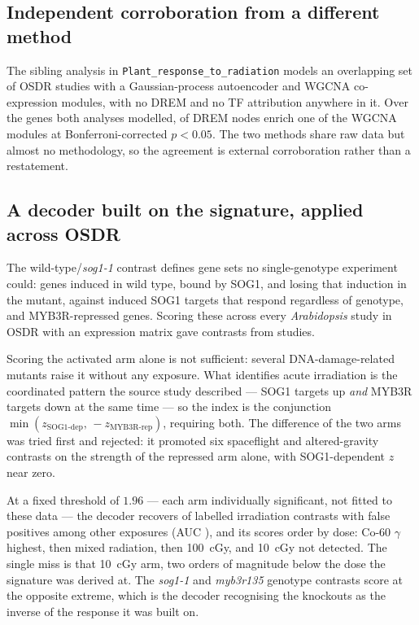\subsection{Independent corroboration from a different method}

The sibling analysis in \texttt{Plant\_response\_to\_radiation} models an overlapping set
of OSDR studies with a Gaussian-process autoencoder and WGCNA co-expression modules, with
no DREM and no TF attribution anywhere in it. Over the
\NumSharedGenesWithSibling{} genes both analyses modelled,
\NumNodesEnrichingModule{} of \NumSiblingNodes{} DREM nodes enrich one of the
\NumSiblingModules{} WGCNA modules at Bonferroni-corrected $p < 0.05$. The two methods
share raw data but almost no methodology, so the agreement is external corroboration
rather than a restatement.

\subsection{A decoder built on the signature, applied across OSDR}

The wild-type/\textit{sog1-1} contrast defines gene sets no single-genotype experiment
could: \NumSignatureSogDep{} genes induced in wild type, bound by SOG1, and losing that
induction in the mutant, against \NumSignatureSogIndep{} induced SOG1 targets that respond
regardless of genotype, and \NumSignatureMybRep{} MYB3R-repressed genes. Scoring these
across every \textit{Arabidopsis} study in OSDR with an expression matrix gave
\NumDecoderContrasts{} contrasts from \NumDecoderStudies{} studies.

Scoring the activated arm alone is not sufficient: several DNA-damage-related mutants
raise it without any exposure. What identifies acute irradiation is the coordinated
pattern the source study described --- SOG1 targets up \emph{and} MYB3R targets down at the
same time --- so the index is the conjunction
$\min(z_{\text{SOG1-dep}},\, -z_{\text{MYB3R-rep}})$, requiring both. The difference of the
two arms was tried first and rejected: it promoted six spaceflight and altered-gravity
contrasts on the strength of the repressed arm alone, with SOG1-dependent $z$ near zero.

At a fixed threshold of $1.96$ --- each arm individually significant, not fitted to these
data --- the decoder recovers \NumPositivesDetected{} of \NumLabelledPositives{} labelled
irradiation contrasts with \NumFalsePositives{} false positives among
\NumOtherExposures{} other exposures (AUC \DecoderAUC{}), and its scores order by dose:
Co-60 $\gamma$ highest, then mixed radiation, then 100~cGy, and 10~cGy not
detected. The single miss is that 10~cGy arm, two orders of magnitude below the dose the
signature was derived at. The \textit{sog1-1} and \textit{myb3r135} genotype contrasts
score at the opposite extreme, which is the decoder
recognising the knockouts as the inverse of the response it was built on.

